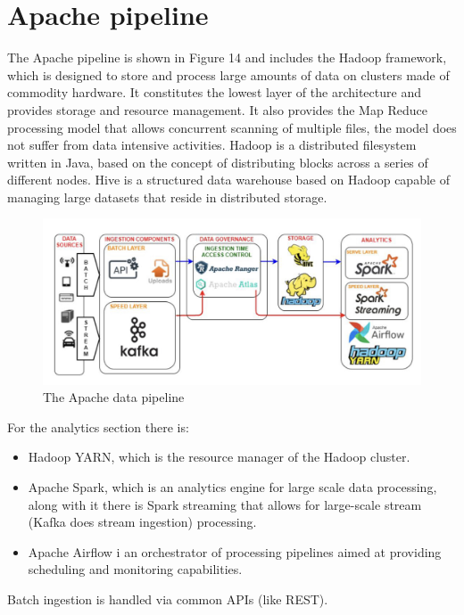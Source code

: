 \section{Apache pipeline}
The Apache pipeline is shown in Figure 14 and includes the Hadoop framework, which is designed to store and process large amounts of data on clusters made of commodity hardware. It constitutes the lowest layer of the architecture and provides storage and resource management. \n
It also provides the Map Reduce processing model that allows concurrent scanning of multiple files, the model does not suffer from data intensive activities. \n
Hadoop is a distributed filesystem written in Java, based on the concept of distributing blocks across a series of different nodes. Hive is a structured data warehouse based on Hadoop capable of managing large datasets that reside in distributed storage.
\begin{figure}
    \centering
    \includegraphics[scale=0.2]{Images/apache_architecture.jpeg}
    \caption{The Apache data pipeline}
\end{figure}
For the analytics section there is:
\begin{itemize}
    \item Hadoop YARN, which is the resource manager of the Hadoop cluster.
    \item Apache Spark, which is an analytics engine for large scale data processing, along with it there is Spark streaming that allows for large-scale stream (Kafka does stream ingestion) processing.
    \item Apache Airflow i an orchestrator of processing pipelines aimed at providing scheduling and monitoring capabilities.
\end{itemize}
Batch ingestion is handled via common APIs (like REST).
